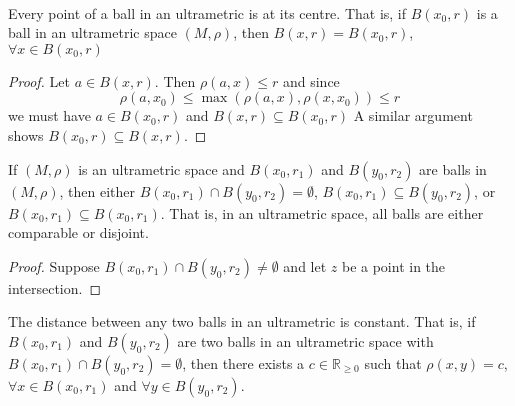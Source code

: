 \\

\begin{proposition}
 Every point of a ball in an ultrametric is at its centre. That is, if $B(x_0, r)$ is a ball in an ultrametric space $(M,\rho)$, then $B(x, r)=B(x_0, r)$,  $\forall x \in B(x_0, r)$
\end{proposition}

\begin{proof}
Let $a \in B(x, r)$. Then $\rho(a,x) \leq r$ and since \[\rho(a,x_0) \leq \max(\rho(a,x), \rho(x,x_0)) \leq r\] we must have $a \in B(x_0, r)$ and  $B(x, r) \subseteq B(x_0, r)$ A similar argument shows $B(x_0, r) \subseteq B(x, r)$.
\end{proof}

\begin{proposition}
	If $(M, \rho)$ is an ultrametric space and $B(x_0, r_1)$ and $B(y_0, r_2)$ are balls in $(M, \rho)$, then either $B(x_0, r_1) \cap B(y_0, r_2) = \emptyset$, $B(x_0, r_1) \subseteq B(y_0, r_2)$, or $B(x_0, r_1) \subseteq B(x_0, r_1)$. That is, in an ultrametric space, all balls are either comparable or disjoint.
\end{proposition}

\begin{proof}
Suppose $B(x_0, r_1) \cap B(y_0, r_2) \neq \emptyset$ and let $z$ be a point in the intersection. 
\end{proof}

\begin{proposition}
 The distance between any two  balls in an ultrametric is constant. That is, if $B(x_0, r_1)$ and $B(y_0, r_2)$ are two balls in an ultrametric space with $B(x_0, r_1) \cap B(y_0, r_2) = \emptyset$, then there exists a $c \in \mathbb{R}_{\geq 0}$ such that  $\rho(x,y)=c$, $\forall x \in B(x_0, r_1)$ and $\forall y \in B(y_0, r_2)$.
\end{proposition}

